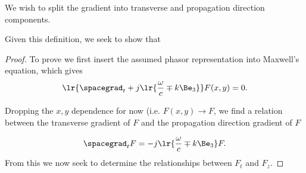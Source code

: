 We wish to split the gradient into transverse and propagation direction components.

Given this definition, we seek to show that

\begin{proof}
To prove we first insert the assumed phasor representation into Maxwell's equation, which gives
\begin{equation}\label{eqn:transverseField:summaryMax2}
\lr{\spacegrad_t + j \lr{ \frac{\omega}{c} \mp k \Be_3 } } F(x,y) = 0.
\end{equation}

Dropping the \( x, y \) dependence for now (i.e.  \( F(x, y) \rightarrow F \), we find a relation between the transverse gradient of \( F \) and the propagation direction gradient of \( F \)

\begin{equation}\label{eqn:transverseField:148}
\spacegrad_t F = - j \lr{ \frac{\omega}{c} \mp k \Be_3 } F.
\end{equation}
From this we now seek to determine the relationships between \( F_t \) and \( F_z \).


\end{proof}
